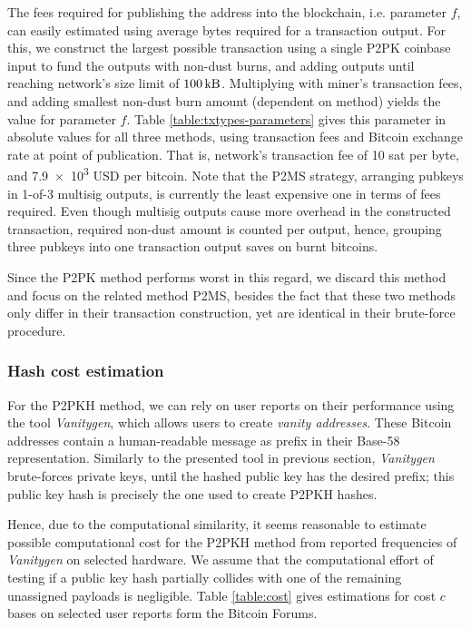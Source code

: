 \documentclass[a4paper,11pt,titlepage]{scrbook}
\begin{document}
The fees required for publishing the address into the blockchain, i.e. parameter $f$, can easily estimated using average bytes required for a transaction output.
For this, we construct the largest possible transaction  using a single P2PK coinbase input to fund the outputs with non-dust burns, and adding outputs until reaching network's size limit of $\SI{100}{\kilo\byte}$.
Multiplying with miner's transaction fees, and adding smallest non-dust burn amount (dependent on method) yields the value for parameter $f$.
Table \ref{table:txtypes-parameters} gives this parameter in absolute values for all three methods, using transaction fees and Bitcoin exchange rate at point of publication.
That is, network's transaction fee of 10 sat per byte, and \num{7.9e3} USD per bitcoin.
Note that the P2MS strategy, arranging pubkeys in 1-of-3 multisig outputs, is currently the least expensive one in terms of fees required.
Even though multisig outputs cause more overhead in the constructed transaction, required non-dust amount is counted per output, hence, grouping three pubkeys into one transaction output saves on burnt bitcoins.

Since the P2PK method performs worst in this regard, we discard this method and focus on the related method P2MS, besides the fact that these two methods only differ in their transaction construction, yet are identical in their brute-force procedure.

\subsubsection*{Hash cost estimation}
For the {P2PKH} method, we can rely on user reports on their performance using the tool \emph{Vanitygen}, which allows users to create \emph{vanity addresses}.
These Bitcoin addresses contain a human-readable message as prefix in their Base-58 representation. \cite[Cf.][82--83]{antonopoulos_mastering_2017}
Similarly to the presented tool in previous section, \emph{Vanitygen} brute-forces private keys, until the hashed public key has the desired prefix;
this public key hash is precisely the one used to create {P2PKH} hashes.

Hence, due to the computational similarity, it seems reasonable to estimate possible computational cost for the {P2PKH} method from reported frequencies of \emph{Vanitygen} on selected hardware.
We assume that the computational effort of testing if a public key hash partially collides with one of the remaining unassigned payloads is negligible.
Table \ref{table:cost} gives estimations for cost $c$ bases on selected user reports form the Bitcoin Forums.
\end{document}
